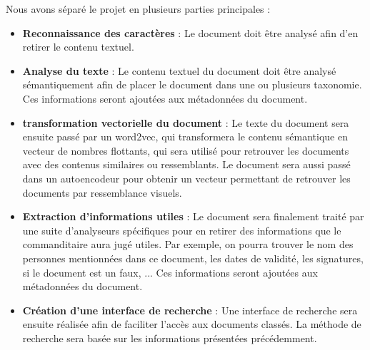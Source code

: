 Nous avons séparé le projet en plusieurs parties principales :
\begin {itemize}
\item \textbf {Reconnaissance des caractères} :
Le document doit être analysé afin d'en retirer le contenu textuel.
\\
\item \textbf {Analyse du texte} :
Le contenu textuel du document doit être analysé sémantiquement afin de placer le document dans une ou plusieurs taxonomie. 
Ces informations seront ajoutées aux métadonnées du document.
\\
\item \textbf {transformation vectorielle du document} :
Le texte du document sera ensuite passé par un word2vec, qui transformera le contenu sémantique en vecteur de nombres flottants, qui sera utilisé pour retrouver les documents avec des contenus similaires ou ressemblants.
Le document sera aussi passé dans un autoencodeur pour obtenir un vecteur permettant de retrouver les documents par ressemblance visuels.
\\
\item \textbf {Extraction d'informations utiles} :
Le document sera finalement traité par une suite d'analyseurs spécifiques pour en retirer des informations que le commanditaire aura jugé utiles.
Par exemple, on pourra trouver le nom des personnes mentionnées dans ce document, les dates de validité, les signatures, si le document est un faux, ... 
Ces informations seront ajoutées aux métadonnées du document.
\\
\item \textbf{Création d'une interface de recherche} :
Une interface de recherche sera ensuite réalisée afin de faciliter l'accès aux documents classés.
La méthode de recherche sera basée sur les informations présentées précédemment.
\\
\end {itemize}




